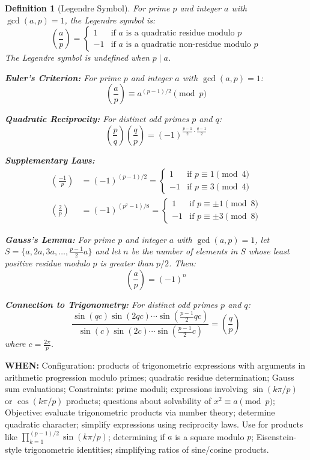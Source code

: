 \documentclass[12pt]{article}
\newtheorem{definition}{Definition}[section]
\begin{document}
\begin{definition}[Legendre Symbol]
For prime $p$ and integer $a$ with $\gcd(a,p) = 1$, the Legendre symbol is:
\[
\left(\frac{a}{p}\right) = \begin{cases}
1 & \text{if } a \text{ is a quadratic residue modulo } p \\
-1 & \text{if } a \text{ is a quadratic non-residue modulo } p
\end{cases}
\]
The Legendre symbol is undefined when $p \mid a$.

\textbf{Euler's Criterion:} For prime $p$ and integer $a$ with $\gcd(a,p) = 1$:
\[
\left(\frac{a}{p}\right) \equiv a^{(p-1)/2} \pmod{p}
\]

\textbf{Quadratic Reciprocity:} For distinct odd primes $p$ and $q$:
\[
\left(\frac{p}{q}\right)\left(\frac{q}{p}\right) = (-1)^{\frac{p-1}{2} \cdot \frac{q-1}{2}}
\]

\textbf{Supplementary Laws:}
\begin{align}
\left(\frac{-1}{p}\right) &= (-1)^{(p-1)/2} = \begin{cases} 1 & \text{if } p \equiv 1 \pmod{4} \\ -1 & \text{if } p \equiv 3 \pmod{4} \end{cases} \\
\left(\frac{2}{p}\right) &= (-1)^{(p^2-1)/8} = \begin{cases} 1 & \text{if } p \equiv \pm 1 \pmod{8} \\ -1 & \text{if } p \equiv \pm 3 \pmod{8} \end{cases}
\end{align}

\textbf{Gauss's Lemma:} For prime $p$ and integer $a$ with $\gcd(a,p) = 1$, let $S = \{a, 2a, 3a, \ldots, \frac{p-1}{2}a\}$ and let $n$ be the number of elements in $S$ whose least positive residue modulo $p$ is greater than $p/2$. Then:
\[
\left(\frac{a}{p}\right) = (-1)^n
\]

\textbf{Connection to Trigonometry:} For distinct odd primes $p$ and $q$:
\[
\frac{\sin(qc)\sin(2qc)\cdots\sin(\frac{p-1}{2}qc)}{\sin(c)\sin(2c)\cdots\sin(\frac{p-1}{2}c)} = \left(\frac{q}{p}\right)
\]
where $c = \frac{2\pi}{p}$.
\end{definition}

\textbf{WHEN:} Configuration: products of trigonometric expressions with arguments in arithmetic progression modulo primes; quadratic residue determination; Gauss sum evaluations; Constraints: prime moduli; expressions involving $\sin(k\pi/p)$ or $\cos(k\pi/p)$ products; questions about solvability of $x^2 \equiv a \pmod{p}$; Objective: evaluate trigonometric products via number theory; determine quadratic character; simplify expressions using reciprocity laws. Use for products like $\prod_{k=1}^{(p-1)/2} \sin(k\pi/p)$; determining if $a$ is a square modulo $p$; Eisenstein-style trigonometric identities; simplifying ratios of sine/cosine products.
\end{document}
